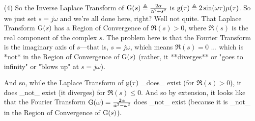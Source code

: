 (4) So the Inverse Laplace Transform of $\mathrm{G}(s)\triangleq\frac{2\alpha}{\alpha^2+s^2}$ is $\mathrm{g}(\tau)\triangleq 2\sin(\omega\tau)\mu(\tau)$. So we just set $s=j\omega$ and we're all done here, right? Well not quite. That Laplace Transform $\mathrm{G}(s)$ has a Region of Convergence of $\Re(s)>0$, where $\Re(s)$ is the real component of the complex $s$. The problem here is that the Fourier Transform is the imaginary axis of $s$---that is, $s=j\omega$, which means $\Re(s)=0$ ... which is *not* in the Region of Convergence of $\mathrm{G}(s)$ (rather, it **diverges** or "goes to infinity" or "blows up" at $s=j\omega$).

And so, while the Laplace Transform of $\mathrm{g}(\tau)$ _does_ exist (for $\Re(s)>0$), it does _not_ exist (it diverges) for $\Re(s)\leq0$. And so by extension, it looks like that the Fourier Transform $\mathrm{G}(\omega)=\frac{2\alpha}{\alpha^2-\omega^2}$ does _not_ exist (because it is _not_ in the Region of Convergence of $\mathrm{G}(s)$).
